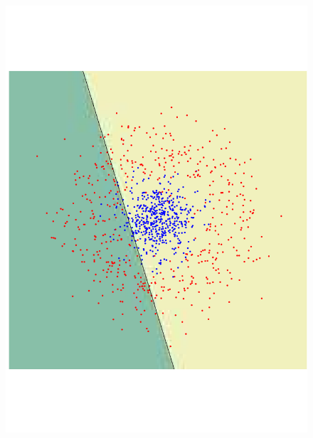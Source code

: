 \begin{figure}
\begin{center}
 \includegraphics[angle=270, scale=0.166]{ch4/figures/59.pdf}

\end{center}
\end{figure}
